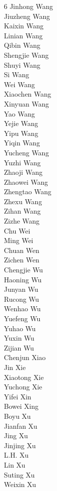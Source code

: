 \documentclass{article}
\begin{document}
\begin{multicols}{6}
{Jinhong Wang\\
Jiuzheng Wang\\
Kaixin Wang\\
Linian Wang\\
Qibin Wang\\
Shengjie Wang\\
Shuyi Wang\\
Si Wang\\
Wei Wang\\
Xiaochen Wang\\
Xinyuan Wang\\
Yao Wang\\
Yejie Wang\\
Yipu Wang\\
Yiqin Wang\\
Yucheng Wang\\
Yuzhi Wang\\
Zhaoji Wang\\
Zhaowei Wang\\
Zhengtao Wang\\
Zhexu Wang\\
Zihan Wang\\
Zizhe Wang\\
Chu Wei\\
Ming Wei\\
Chuan Wen\\
Zichen Wen\\
Chengjie Wu\\
Haoning Wu\\
Junyan Wu\\
Rucong Wu\\
Wenhao Wu\\
Yuefeng Wu\\
Yuhao Wu\\
Yuxin Wu\\
Zijian Wu\\
Chenjun Xiao\\
Jin Xie\\
Xiaotong Xie\\
Yuchong Xie\\
Yifei Xin\\
Bowei Xing\\
Boyu Xu\\
Jianfan Xu\\
Jing Xu\\
Jinjing Xu\\
L.H. Xu\\
Lin Xu\\
Suting Xu\\
Weixin Xu\\
}
\end{multicols}
\end{document}
